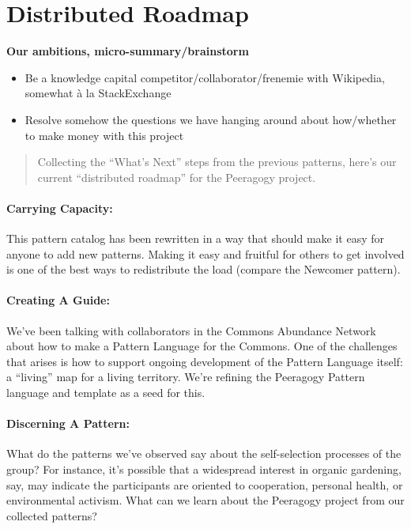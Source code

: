 \section{Distributed Roadmap}

\textbf{Our ambitions, micro-summary/brainstorm}
\begin{itemize}
\item Be a knowledge capital competitor/collaborator/frenemie with Wikipedia, somewhat \`a la StackExchange
\item Resolve somehow the questions we have hanging around about how/whether to make money with this project 
\end{itemize}

\begin{quote}
Collecting the ``What's Next'' steps from the previous patterns, here's
our current ``distributed roadmap'' for the Peeragogy project.
\end{quote}

\paragraph{Carrying Capacity:} This pattern catalog has been rewritten in a way that should make it
easy for anyone to add new patterns. Making it easy and fruitful for
others to get involved is one of the best ways to redistribute the load
(compare the Newcomer pattern).

\paragraph{Creating A Guide:} We’ve been talking with collaborators in the Commons Abundance Network
about how to make a Pattern Language for the Commons. One of the
challenges that arises is how to support ongoing development of the
Pattern Language itself: a “living” map for a living territory. We’re
refining the Peeragogy Pattern language and template as a seed for this.

\paragraph{Discerning A Pattern:} What do the patterns we’ve observed say about the self-selection
processes of the group? For instance, it’s possible that a widespread
interest in organic gardening, say, may indicate the participants are
oriented to cooperation, personal health, or environmental activism.
What can we learn about the Peeragogy project from our collected
patterns?

